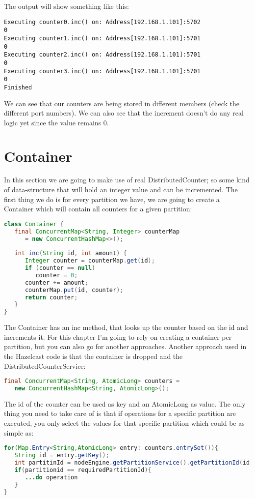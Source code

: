 The output will show something like this:
\begin{lstlisting}
Executing counter0.inc() on: Address[192.168.1.101]:5702
0
Executing counter1.inc() on: Address[192.168.1.101]:5701
0
Executing counter2.inc() on: Address[192.168.1.101]:5701
0
Executing counter3.inc() on: Address[192.168.1.101]:5701
0
Finished
\end{lstlisting}
We can see that our counters are being stored in different members (check the different port numbers). We can also see that the increment doesn't do any real logic yet since the value remains 0.

\section{Container}
In this section we are going to make use of real DistributedCounter; so some kind of data-structure that will hold an integer value and can be incremented. The first thing we do is for every partition we have, we are going to create a Container which will contain all counters for a given partition:
\begin{lstlisting}[language=java]
class Container {
   final ConcurrentMap<String, Integer> counterMap 
      = new ConcurrentHashMap<>();
   
   int inc(String id, int amount) {
      Integer counter = counterMap.get(id);
      if (counter == null) 
         counter = 0;
      counter += amount;
      counterMap.put(id, counter);
      return counter;
   }
}
\end{lstlisting}
The Container has an inc method, that looks up the counter based on the id and increments it. For this chapter I'm going to rely on creating a container per partition, but you can also go for another approaches. Another approach used in the Hazelcast code is that the container is dropped and the DistributedCounterService:
\begin{lstlisting}[language=java]
final ConcurrentMap<String, AtomicLong> counters = 
   new ConcurrentHashMap<String, AtomicLong>();
\end{lstlisting}
The id of the counter can be used as key and an AtomicLong as value. The only thing you need to take care of is that if operations for a specific partition are executed, you only select the values for that specific partition which could be as simple as: 
\begin{lstlisting}[language=java]
for(Map.Entry<String,AtomicLong> entry: counters.entrySet()){
   String id = entry.getKey();
   int partitinId = nodeEngine.getPartitionService().getPartitionId(id); 
   if(partitionid == requiredPartitionId){
      ...do operation	
   }
}
\end{lstlisting}

